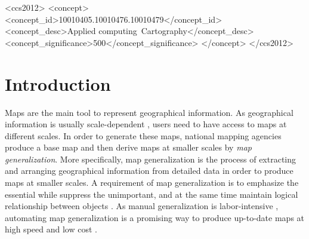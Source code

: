\documentclass[acmsmall,natbib=false]{acmart}
\begin{document}
%
%
\begin{CCSXML}
	<ccs2012>
	<concept>
	<concept_id>10010405.10010476.10010479</concept_id>
	<concept_desc>Applied computing~Cartography</concept_desc>
	<concept_significance>500</concept_significance>
	</concept>
	</ccs2012>
\end{CCSXML}




\maketitle

\section{Introduction}
\label{sec:Introduction}

Maps are the main tool to represent geographical information. 
As geographical information is usually scale-dependent
\parencite{Muller1995Generalization,Weibel1997}, 
users need to have access to maps at different scales.
In order to generate these maps,
national mapping agencies produce a base map
and then derive maps at smaller scales by 
\emph{map generalization}.
More specifically, 
map generalization is the process of extracting and arranging
geographical information from detailed data in order to produce maps
at smaller scales.
A requirement of map generalization is to emphasize the 
essential while suppress the unimportant,
and at the same time maintain logical relationship between 
objects \parencite{Weibel1997}.
As manual generalization is labor-intensive
\parencite{Duchene2014},
automating map generalization is a promising way 
to produce up-to-date maps at high speed and low cost 
\parencite{Mackaness2017Generalization}.
\end{document}
